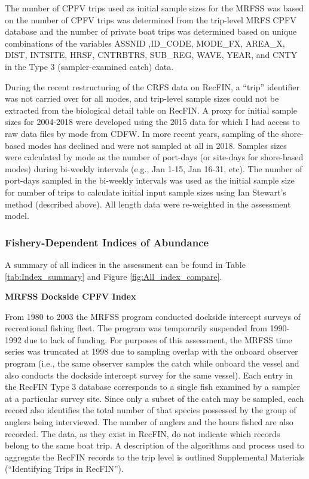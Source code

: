\documentclass[12pt,]{article}
\begin{document}
The number of CPFV trips used as initial sample sizes for the MRFSS was
based on the number of CPFV trips was determined from the trip-level
MRFS CPFV database and the number of private boat trips was determined
based on unique combinations of the variables ASSNID ,ID\_CODE,
MODE\_FX, AREA\_X, DIST, INTSITE, HRSF, CNTRBTRS, SUB\_REG, WAVE, YEAR,
and CNTY in the Type 3 (sampler-examined catch) data.

During the recent restructuring of the CRFS data on RecFIN, a ``trip''
identifier was not carried over for all modes, and trip-level sample
sizes could not be extracted from the biological detail table on RecFIN.
A proxy for initial sample sizes for 2004-2018 were developed using the
2015 data for which I had access to raw data files by mode from CDFW. In
more recent years, sampling of the shore-based modes has declined and
were not sampled at all in 2018. Samples sizes were calculated by mode
as the number of port-days (or site-days for shore-based modes) during
bi-weekly intervals (e.g., Jan 1-15, Jan 16-31, etc). The number of
port-days sampled in the bi-weekly intervals was used as the initial
sample size for number of trips to calculate initial input sample sizes
using Ian Stewart's method (described above). All length data were
re-weighted in the assessment model.

\subsubsection{Fishery-Dependent Indices of
Abundance}\label{fishery-dependent-indices-of-abundance}

A summary of all indices in the assessment can be found in Table
\ref{tab:Index_summary} and Figure \ref{fig:All_index_compare}.

\textbf{MRFSS Dockside CPFV Index}

From 1980 to 2003 the MRFSS program conducted dockside intercept surveys
of recreational fishing fleet. The program was temporarily suspended
from 1990-1992 due to lack of funding. For purposes of this assessment,
the MRFSS time series was truncated at 1998 due to sampling overlap with
the onboard observer program (i.e., the same observer samples the catch
while onboard the vessel and also conducts the dockside intercept survey
for the same vessel). Each entry in the RecFIN Type 3 database
corresponds to a single fish examined by a sampler at a particular
survey site. Since only a subset of the catch may be sampled, each
record also identifies the total number of that species possessed by the
group of anglers being interviewed. The number of anglers and the hours
fished are also recorded. The data, as they exist in RecFIN, do not
indicate which records belong to the same boat trip. A description of
the algorithms and process used to aggregate the RecFIN records to the
trip level is outlined Supplemental Materials (``Identifying Trips in
RecFIN'').
\end{document}
